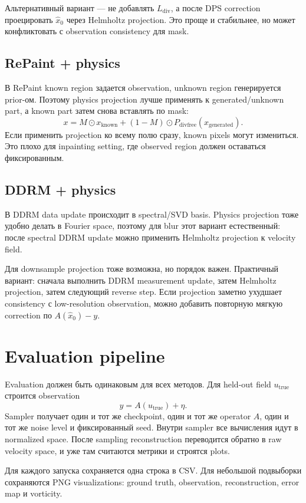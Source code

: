 \documentclass[10pt]{article}
\begin{document}
Альтернативный вариант --- не добавлять \(L_{\mathrm{div}}\), а после DPS correction
проецировать \(\hat x_0\) через Helmholtz projection. Это проще и стабильнее, но может
конфликтовать с observation consistency для mask.

\subsection{RePaint + physics}

В RePaint known region задается observation, unknown region генерируется prior-ом. Поэтому
physics projection лучше применять к generated/unknown part, а known part затем снова
вставлять по mask:
\[
    x = M\odot x_{\mathrm{known}} + (1-M)\odot P_{\mathrm{divfree}}(x_{\mathrm{generated}}).
\]
Если применить projection ко всему полю сразу, known pixels могут измениться. Это плохо для
inpainting setting, где observed region должен оставаться фиксированным.

\subsection{DDRM + physics}

В DDRM data update происходит в spectral/SVD basis. Physics projection тоже удобно делать
в Fourier space, поэтому для blur этот вариант естественный: после spectral DDRM update
можно применить Helmholtz projection к velocity field.

Для downsample projection тоже возможна, но порядок важен. Практичный вариант:
сначала выполнить DDRM measurement update, затем Helmholtz projection, затем следующий
reverse step. Если projection заметно ухудшает consistency с low-resolution observation,
можно добавить повторную мягкую correction по \(A(\hat x_0)-y\).

\section{Evaluation pipeline}

Evaluation должен быть одинаковым для всех методов. Для held-out field
\(u_{\mathrm{true}}\) строится observation
\[
    y = A(u_{\mathrm{true}}) + \eta.
\]
Sampler получает один и тот же checkpoint, один и тот же operator \(A\), один и тот же
noise level и фиксированный seed. Внутри sampler все вычисления идут в normalized space.
После sampling reconstruction переводится обратно в raw velocity space, и уже там
считаются метрики и строятся plots.

Для каждого запуска сохраняется одна строка в CSV. Для небольшой подвыборки сохраняются
PNG visualizations: ground truth, observation, reconstruction, error map и vorticity.
\end{document}
